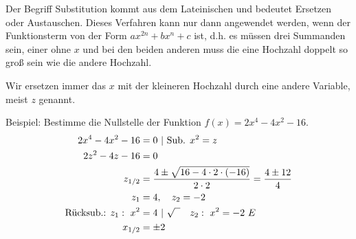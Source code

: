 Der Begriff Substitution kommt aus dem Lateinischen und bedeutet Ersetzen oder Austauschen. Dieses Verfahren kann nur dann angewendet werden, wenn der Funktionsterm von der Form \(ax^{2n}+bx^n+c\) ist, d.h. es müssen drei Summanden sein, einer ohne \(x\) und bei den beiden anderen muss die eine Hochzahl doppelt so groß sein wie die andere Hochzahl.

Wir ersetzen immer das \(x\) mit der kleineren Hochzahl durch eine andere Variable, meist \(z\) genannt.

Beispiel: Bestimme die Nullstelle der Funktion \(f(x)=2x^4-4x^2-16\).
{\large\textcolor{loes}{\begin{align*}
		2x^4-4x^2-16&=0\ \vert\ \text{Sub. }x^2=z\\
		2z^2-4z-16&=0\\
		z_{1/2}&=\frac{4\pm\sqrt{16-4\cdot 2\cdot \left( -16\right) }}{2\cdot 2}=\frac{4\pm 12}{4}\\
		z_1&=4,\quad z_2=-2\\
		\text{Rücksub.: }z_1:\ x^2&=4\ \vert\ \sqrt{\phantom{x}}\quad z_2:\ x^2=-2\ \Lightning\\
		x_{1/2}&=\pm2
\end{align*}}}
\newpage
